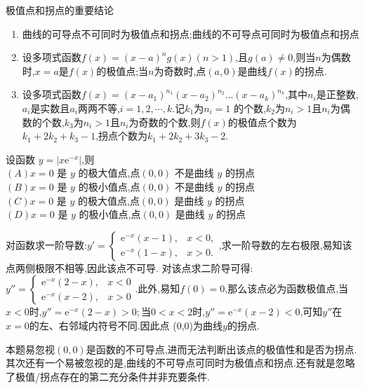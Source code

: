 \documentclass[8pt a4paper, oneside, UTF8]{ctexbook}  %
\begin{document}
\begin{sloppypar}
\begin{conclusion}{极值点和拐点的重要结论}{}
\begin{enumerate}
\begin{itemize}
                  \end{itemize}
            \item 曲线的可导点不可同时为极值点和拐点;曲线的不可导点可同时为极值点和拐点
            \item 设多项式函数$f(x)=(x-a)^n g(x)(n>1)$,且$g(a)\neq0$,则当$n$为偶数时,$x=a$是$f(x)$的极值点;当$n$为奇数时,点$(a,0)$是曲线$f(x)$的拐点.
            \item 设多项式函数$f(x)=(x-a_1)^{n_1}(x-a_2)^{n_2}...(x-a_k)^{n_k}$,其中$n_i$是正整数,$a_i$是实数且$a_i$两两不等,$i= 1, 2, \cdots,k$.记$k_1$为$n_i=1$ 的个数,$k_2$为$n_i>1$且$n_i$为偶数的个数,$k_3$为$n_i>1$且$n_i$为奇数的个数,则$f(x)$的极值点个数为$k_1+2k_2+k_3-1$,拐点个数为$k_1+2k_2+3k_3-2.$
        \end{enumerate}
    \end{conclusion}
    \begin{problem}
    设函数 $y=\left|x\mathrm{e}^{-x}\right|$,则\\
    $(A)x=0$ 是 $y$ 的极大值点,点$(0,0)$ 不是曲线 $y$ 的拐点\\
    $(B)x=0$ 是 $y$ 的极小值点,点$(0,0)$ 不是曲线 $y$ 的拐点\\
    $(C)x=0$ 是 $y$ 的极大值点,点$(0,0)$ 是曲线 $y$ 的拐点\\
    $(D)x=0$ 是 $y$ 的极小值点,点$(0,0)$ 是曲线 $y$ 的拐点
    \end{problem}
    \begin{solution}
        对函数求一阶导数:$y'=\begin{cases}\mathrm{e}^{-x}\left(x-1\right),&x<0,\\\mathrm{e}^{-x}\left(1-x\right),&x>0.\end{cases}$,求一阶导数的左右极限,易知该点两侧极限不相等,因此该点不可导. 对该点求二阶导可得: $y''=\begin{cases}\mathrm{e}^{-x}(2-x),&x<0\\\mathrm{e}^{-x}(x-2),&x>0\end{cases}.$此外,易知$f(0)=0$,那么该点必为函数极值点,当$x<0$时,$y''=\mathrm{e}^{-x}(2-x)>0;$当$0<x<2$时,$y''=\mathrm{e}^{-x}(x-2)<0$,可知$y''$在$x=0$的左、右邻域内符号不同.因此点 (0,0)为曲线$y$的拐点.
    \end{solution}
    \begin{note}
        本题易忽视$(0,0)$是函数的不可导点,进而无法判断出该点的极值性和是否为拐点.其次还有一个易被忽视的是,曲线的不可导点可同时为极值点和拐点.还有就是忽略了极值/拐点存在的第二充分条件并非充要条件.
    \end{note}
    \begin{problem}

\end{problem}
\end{sloppypar}
\end{document}
